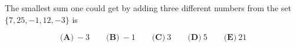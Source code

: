 

The smallest sum one could get by adding three different numbers from the set $ \{7,25,-1,12,-3 \}$ is

\[ \textbf{(A)}\ -3 \qquad
\textbf{(B)}\ -1 \qquad
\textbf{(C)}\ 3 \qquad
\textbf{(D)}\ 5 \qquad
\textbf{(E)}\ 21
\]